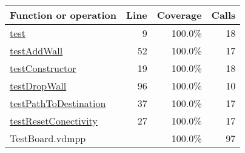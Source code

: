 \bigskip
\begin{longtable}{|l|r|r|r|}
\hline
Function or operation & Line & Coverage & Calls \\
\hline
\hline
\hyperref[test:9]{test} & 9&100.0\% & 18 \\
\hline
\hyperref[testAddWall:52]{testAddWall} & 52&100.0\% & 17 \\
\hline
\hyperref[testConstructor:19]{testConstructor} & 19&100.0\% & 18 \\
\hline
\hyperref[testDropWall:96]{testDropWall} & 96&100.0\% & 10 \\
\hline
\hyperref[testPathToDestination:37]{testPathToDestination} & 37&100.0\% & 17 \\
\hline
\hyperref[testResetConectivity:27]{testResetConectivity} & 27&100.0\% & 17 \\
\hline
\hline
TestBoard.vdmpp & & 100.0\% & 97 \\
\hline
\end{longtable}


